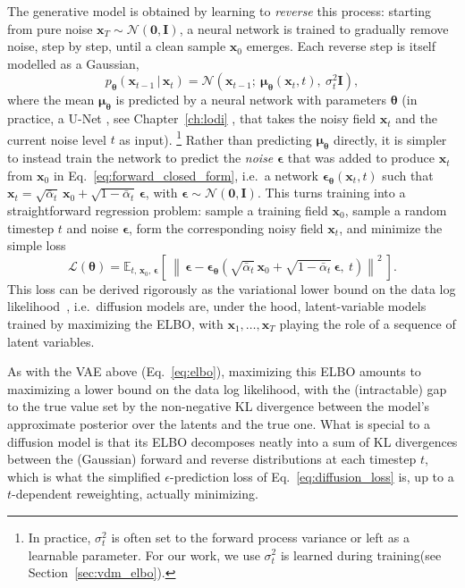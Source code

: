 The generative model is obtained by learning to \emph{reverse} this process: starting from pure noise $\bm{x}_T\sim\mathcal{N}(\bm{0},\bm{I})$, a neural network is trained to gradually remove noise, step by step, until a clean sample $\bm{x}_0$ emerges. Each reverse step is itself modelled as a Gaussian,
\begin{equation}
    p_{\bm{\theta}}(\bm{x}_{t-1}\,|\,\bm{x}_t) = \mathcal{N}\!\left(\bm{x}_{t-1};\ \bm{\mu}_{\bm{\theta}}(\bm{x}_t,t),\ \sigma_t^2\bm{I}\right),
\end{equation}
where the mean $\bm{\mu}_{\bm{\theta}}$ is predicted by a neural network with parameters $\bm{\theta}$ (in practice, a U-Net , see Chapter~\ref{ch:lodi} , that takes the noisy field $\bm{x}_t$ and the current noise level $t$ as input). \footnote{In practice, $\sigma_t^2$ is often set to the forward process variance or left as a learnable parameter. For our work, we use $\sigma_t^2$ is learned during training(see Section~\ref{sec:vdm_elbo}).} Rather than predicting $\bm{\mu}_{\bm{\theta}}$ directly, it is simpler to instead train the network to predict the \emph{noise} $\bm{\epsilon}$ that was added to produce $\bm{x}_t$ from $\bm{x}_0$ in Eq.~\ref{eq:forward_closed_form}, i.e.\ a network $\bm{\epsilon}_{\bm{\theta}}(\bm{x}_t,t)$ such that $\bm{x}_t=\sqrt{\bar\alpha_t}\,\bm{x}_0+\sqrt{1-\bar\alpha_t}\,\bm{\epsilon}$, with $\bm{\epsilon}\sim\mathcal{N}(\bm{0},\bm{I})$. This turns training into a straightforward regression problem: sample a training field $\bm{x}_0$, sample a random timestep $t$ and noise $\bm{\epsilon}$, form the corresponding noisy field $\bm{x}_t$, and minimize the simple loss
\begin{equation}
\label{eq:diffusion_loss}
    \mathcal{L}(\bm{\theta}) = \mathbb{E}_{t,\,\bm{x}_0,\,\bm{\epsilon}}\left[\ \left\lVert\, \bm{\epsilon} - \bm{\epsilon}_{\bm{\theta}}\!\left(\sqrt{\bar\alpha_t}\,\bm{x}_0+\sqrt{1-\bar\alpha_t}\,\bm{\epsilon},\ t\right)\right\rVert^2\ \right].
\end{equation}
This loss can be derived rigorously as the variational lower bound on the data log likelihood~\citep{sohl-dickstein_deep_2015,ho_denoising_2020,kingma_variational_2023}, i.e.\ diffusion models are, under the hood, latent-variable models trained by maximizing the ELBO, with $\bm{x}_1,\dots,\bm{x}_T$ playing the role of a sequence of latent variables.

As with the VAE above (Eq.~\ref{eq:elbo}), maximizing this ELBO amounts to maximizing a lower bound on the data log likelihood, with the (intractable) gap to the true value set by the non-negative KL divergence between the model's approximate posterior over the latents and the true one. What is special to a diffusion model is that its ELBO decomposes neatly into a sum of KL divergences between the (Gaussian) forward and reverse distributions at each timestep $t$, which is what the simplified $\epsilon$-prediction loss of Eq.~\ref{eq:diffusion_loss} is, up to a $t$-dependent reweighting, actually minimizing.

